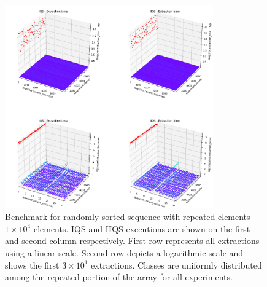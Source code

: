 \begin{figure}[!ht]
    \centering
    \includegraphics[width=0.8\textwidth]{./fragments/04_experimental_execution/images/01_basebenchmark_05_classes.png}
    \caption{Benchmark for randomly sorted sequence with repeated elements $1\times10^4$ elements. IQS and IIQS executions are shown on the first and second column respectively. First row represents all extractions using a linear scale. Second row depicts a logarithmic scale and shows the first $3\times10^1$ extractions. Classes are uniformly distributed among the repeated portion of the array for all experiments.}
    \label{FIG:BENCHMARK_05_CLASSES}
\end{figure}

